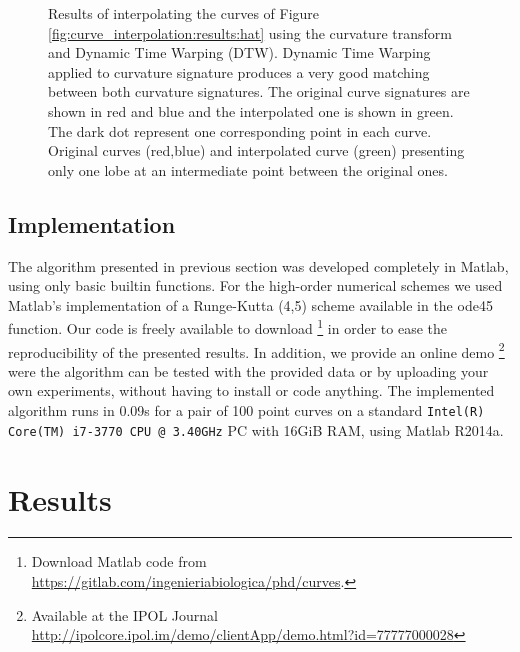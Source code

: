\documentclass{ipol}
\newcommand{\chapFiveDir}{images/chapter_05a}
\begin{document}
\begin{figure}[h]
	\centering
	\caption{Results of interpolating the curves of Figure \ref{fig:curve_interpolation:results:hat} using the curvature transform and Dynamic Time Warping (DTW).
		\protect{} Dynamic Time Warping applied to curvature signature produces a very good matching between both curvature signatures. The original curve signatures are shown in red and blue and the interpolated one is shown in green. The dark dot represent one corresponding point in each curve. \protect{} Original curves (red,blue) and interpolated curve (green) presenting only one lobe at an intermediate point between the original ones. \label{fig:curve_interpolation:results:hat:interp:dtw}
	}
\end{figure}

\subsection{Implementation}

The algorithm presented in previous section was developed completely in Matlab, using only basic builtin functions. For the high-order numerical schemes we used Matlab's implementation of a Runge-Kutta (4,5) scheme available in the ode45 function. Our code is freely available to download \footnote{Download Matlab code from \url{https://gitlab.com/ingenieriabiologica/phd/curves}.} in order to ease the reproducibility of the presented results.
In addition, we provide an online demo \footnote{Available at the IPOL Journal \url{http://ipolcore.ipol.im/demo/clientApp/demo.html?id=77777000028}} were the algorithm can be tested with the provided data or by uploading your own experiments, without having to install or code anything.
The implemented algorithm runs in 0.09s for a pair of 100 point curves on a standard \verb+Intel(R) Core(TM) i7-3770 CPU @ 3.40GHz+ PC with 16GiB RAM, using Matlab R2014a.

\clearpage
\section{Results}
\end{document}
